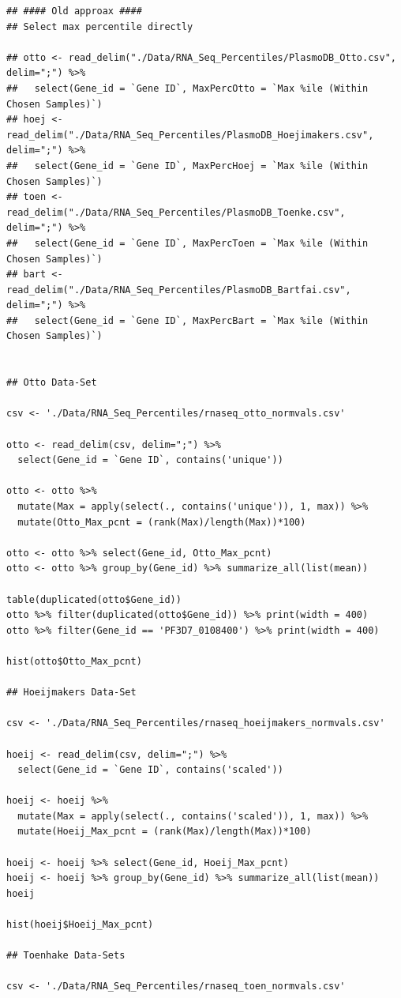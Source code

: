 \documentclass[11pt]{article}
\begin{document}
\begin{verbatim}
## #### Old approax ####
## Select max percentile directly

## otto <- read_delim("./Data/RNA_Seq_Percentiles/PlasmoDB_Otto.csv", delim=";") %>%
##   select(Gene_id = `Gene ID`, MaxPercOtto = `Max %ile (Within Chosen Samples)`)
## hoej <- read_delim("./Data/RNA_Seq_Percentiles/PlasmoDB_Hoejimakers.csv", delim=";") %>%
##   select(Gene_id = `Gene ID`, MaxPercHoej = `Max %ile (Within Chosen Samples)`)
## toen <- read_delim("./Data/RNA_Seq_Percentiles/PlasmoDB_Toenke.csv", delim=";") %>%
##   select(Gene_id = `Gene ID`, MaxPercToen = `Max %ile (Within Chosen Samples)`)
## bart <- read_delim("./Data/RNA_Seq_Percentiles/PlasmoDB_Bartfai.csv", delim=";") %>%
##   select(Gene_id = `Gene ID`, MaxPercBart = `Max %ile (Within Chosen Samples)`)


## Otto Data-Set

csv <- './Data/RNA_Seq_Percentiles/rnaseq_otto_normvals.csv'

otto <- read_delim(csv, delim=";") %>%
  select(Gene_id = `Gene ID`, contains('unique'))

otto <- otto %>%
  mutate(Max = apply(select(., contains('unique')), 1, max)) %>%
  mutate(Otto_Max_pcnt = (rank(Max)/length(Max))*100)

otto <- otto %>% select(Gene_id, Otto_Max_pcnt)
otto <- otto %>% group_by(Gene_id) %>% summarize_all(list(mean))

table(duplicated(otto$Gene_id))
otto %>% filter(duplicated(otto$Gene_id)) %>% print(width = 400)
otto %>% filter(Gene_id == 'PF3D7_0108400') %>% print(width = 400)

hist(otto$Otto_Max_pcnt)

## Hoeijmakers Data-Set

csv <- './Data/RNA_Seq_Percentiles/rnaseq_hoeijmakers_normvals.csv'

hoeij <- read_delim(csv, delim=";") %>%
  select(Gene_id = `Gene ID`, contains('scaled'))

hoeij <- hoeij %>%
  mutate(Max = apply(select(., contains('scaled')), 1, max)) %>%
  mutate(Hoeij_Max_pcnt = (rank(Max)/length(Max))*100)

hoeij <- hoeij %>% select(Gene_id, Hoeij_Max_pcnt)
hoeij <- hoeij %>% group_by(Gene_id) %>% summarize_all(list(mean))
hoeij

hist(hoeij$Hoeij_Max_pcnt)

## Toenhake Data-Sets

csv <- './Data/RNA_Seq_Percentiles/rnaseq_toen_normvals.csv'


\end{verbatim}
\end{document}
